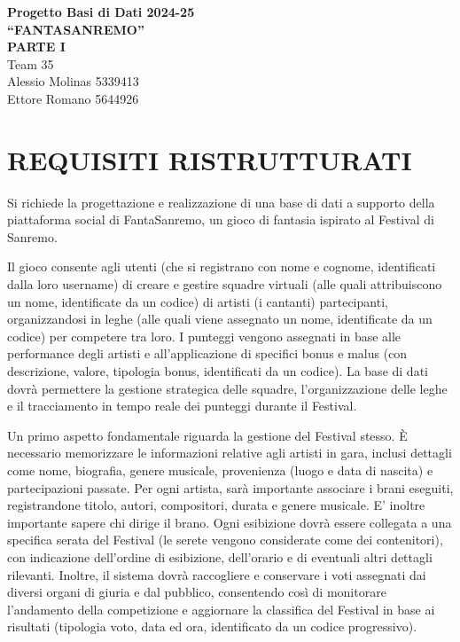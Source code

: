 \documentclass[a4paper,12pt]{article}
\begin{document}
\begin{center}
    {\LARGE \textbf{Progetto Basi di Dati 2024-25}}\\[.5cm]
    {\Large \textbf{“FANTASANREMO”}}\\[.5cm]
    {\Large \textbf{PARTE I}}\\[.8cm]
    Team 35\\[.3cm]
    Alessio Molinas 5339413\\
    Ettore Romano 5644926
\end{center}

\vspace{1cm}

\section{REQUISITI RISTRUTTURATI}
\noindent
Si richiede la progettazione e realizzazione di una base di dati a supporto della piattaforma social di FantaSanremo, un gioco di fantasia ispirato al Festival di Sanremo.

Il gioco consente agli utenti (che si registrano con nome e cognome, identificati dalla loro username) di creare e gestire squadre virtuali (alle quali attribuiscono un nome, identificate da un codice) di artisti (i cantanti) partecipanti, organizzandosi in leghe (alle quali viene assegnato un nome, identificate da un codice) per competere tra loro. I punteggi vengono assegnati in base alle performance degli artisti e all’applicazione di specifici bonus e malus (con descrizione, valore, tipologia bonus, identificati da un codice). La base di dati dovrà permettere la gestione strategica delle squadre, l’organizzazione delle leghe e il tracciamento in tempo reale dei punteggi durante il Festival.

Un primo aspetto fondamentale riguarda la gestione del Festival stesso. È necessario memorizzare le informazioni relative agli artisti in gara, inclusi dettagli come nome, biografia, genere musicale, provenienza (luogo e data di nascita) e partecipazioni passate. Per ogni artista, sarà importante associare i brani eseguiti, registrandone titolo, autori, compositori, durata e genere musicale. E' inoltre importante sapere chi dirige il brano. Ogni esibizione dovrà essere collegata a una specifica serata del Festival (le serete vengono considerate come dei contenitori), con indicazione dell’ordine di esibizione, dell’orario e di eventuali altri dettagli rilevanti.
Inoltre, il sistema dovrà raccogliere e conservare i voti assegnati dai diversi organi di giuria e dal pubblico, consentendo così di monitorare l’andamento della competizione e aggiornare la classifica del Festival in base ai risultati (tipologia voto, data ed ora, identificato da un codice progressivo).
\end{document}
